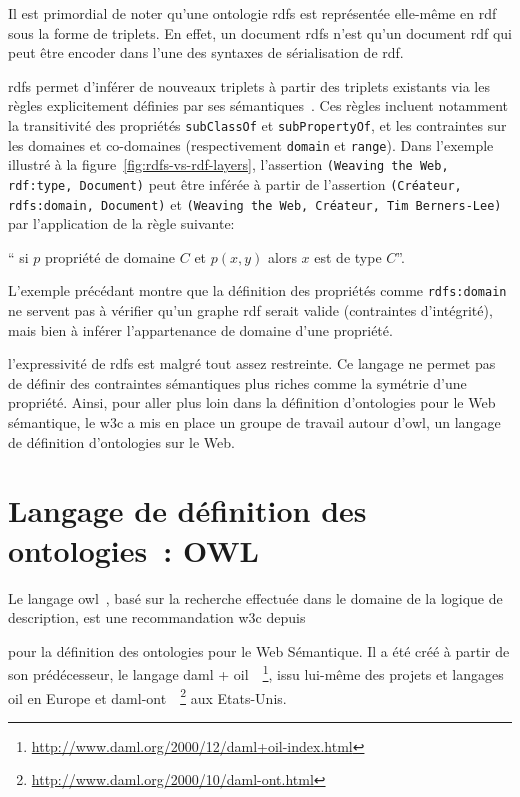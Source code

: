 Il est primordial de noter qu'une ontologie \acrshort{rdfs} est
représentée elle-même en \acrshort{rdf} sous la forme de triplets. En
effet, un document \acrshort{rdfs} n'est qu'un document \acrshort{rdf}
qui peut être encoder dans l'une des syntaxes de sérialisation de
\acrshort{rdf}.\medskip

\acrshort{rdfs} permet d'inférer de nouveaux triplets à partir des
triplets existants via les règles explicitement définies par ses
sémantiques~\cite{hayes2004rdf}. Ces règles incluent notamment la
transitivité des propriétés \texttt{subClassOf} et
\texttt{subPropertyOf}, et les contraintes sur les domaines et
co-domaines (respectivement \texttt{domain} et \texttt{range}). Dans
l'exemple illustré à la figure~\ref{fig:rdfs-vs-rdf-layers},
l'assertion \texttt{(Weaving the Web, rdf:type, Document)} peut être
inférée à partir de l'assertion \texttt{(Créateur, rdfs:domain,
  Document)} et \texttt{(Weaving the Web, Créateur, Tim Berners-Lee)}
par l'application de la règle suivante:\smallskip

`` si $p$ propriété de domaine $C$ et $p(x, y)$ alors $x$ est de type
$C$''.\medskip

L'exemple précédant montre que la définition des propriétés comme
\texttt{rdfs:domain} ne servent pas à vérifier qu'un graphe
\acrshort{rdf} serait valide (contraintes d'intégrité), mais bien à
inférer l'appartenance de domaine d'une propriété.\medskip

l'expressivité de \acrshort{rdfs} est malgré tout assez restreinte. Ce
langage ne permet pas de définir des contraintes sémantiques plus
riches comme la symétrie d'une propriété. Ainsi, pour aller plus loin
dans la définition d'ontologies pour le Web sémantique, le
\acrshort{w3c} a mis en place un groupe de travail autour
d'\acrshort{owl}, un langage de définition d'ontologies sur le
Web.\medskip

\section{Langage de définition des ontologies~: OWL}
\label{sec:semantic-web-owl}

Le langage \acrshort{owl}~\cite{mcguinness2004owl}, basé sur la
recherche effectuée dans le domaine de la logique de description, est
une recommandation \acrshort{w3c} depuis \date{2004} pour la
définition des ontologies pour le Web Sémantique. Il a été créé à
partir de son prédécesseur, le langage \acrshort{daml} +
\acrshort{oil}~\cite{
  horrocks2002daml+oil}~\footnote{\url{http://www.daml.org/2000/12/daml+oil-index.html}},
issu lui-même des projets et langages
\acrshort{oil}\cite{horrocks2000ontology} en Europe et
\acrshort{daml-ont}~\cite{mcguinness2003daml}~\footnote{\url{http://www.daml.org/2000/10/daml-ont.html}}
aux Etats-Unis.\medskip

